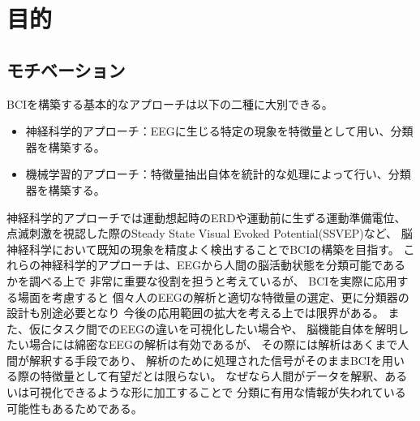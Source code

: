 \section{\mc 目的}
\subsection{\mc モチベーション}
BCIを構築する基本的なアプローチは以下の二種に大別できる。
\begin{itemize}
    \item 神経科学的アプローチ：EEGに生じる特定の現象を特徴量として用い、分類器を構築する。
    \item 機械学習的アプローチ：特徴量抽出自体を統計的な処理によって行い、分類器を構築する。
\end{itemize}
神経科学的アプローチでは運動想起時のERDや運動前に生ずる運動準備電位、
点滅刺激を視認した際のSteady State Visual Evoked Potential(SSVEP)など、
脳神経科学において既知の現象を精度よく検出することでBCIの構築を目指す。
これらの神経科学的アプローチは、EEGから人間の脳活動状態を分類可能であるかを調べる上で
非常に重要な役割を担うと考えているが、
BCIを実際に応用する場面を考慮すると
個々人のEEGの解析と適切な特徴量の選定、更に分類器の設計も別途必要となり
今後の応用範囲の拡大を考える上では限界がある。
また、仮にタスク間でのEEGの違いを可視化したい場合や、
脳機能自体を解明したい場合には綿密なEEGの解析は有効であるが、
その際には解析はあくまで人間が解釈する手段であり、
解析のために処理された信号がそのままBCIを用いる際の特徴量として有望だとは限らない。
なぜなら人間がデータを解釈、あるいは可視化できるような形に加工することで
分類に有用な情報が失われている可能性もあるためである。

